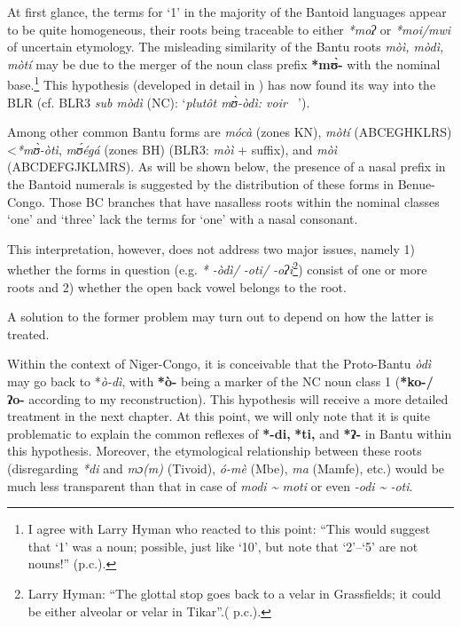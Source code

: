 At first glance, the terms for `1' in the majority of the Bantoid languages appear to be quite homogeneous, their roots being traceable to either \textit{*moʔ} or \textit{*moi/mwi} of uncertain etymology. The misleading similarity of the Bantu roots \textit{mòì, mòdì, mòtí} may be due to the merger of the noun class prefix \textbf{*m{\`{ʊ}}-} with the nominal base.\footnote{I agree with Larry Hyman who reacted to this point: “This would suggest that ‘1’ was a noun; possible, just like ‘10’, but note that `2'--`5' are not nouns!” (p.c.).} This hypothesis (developed in detail in \citealt{Vanhoudt1994}) has now found its way into the BLR (cf. BLR3 \textit{sub mòdì} (NC): ‘\textit{plutôt m{\`{ʊ}}-òdì: voir \citealt{Vanhoudt1994}~}’). 

Among other common Bantu forms are \textit{mócà} (zones KN), \textit{mòtí} (ABCEGHKLRS) <\textit{*m{\`{ʊ}}-òtì}, \textit{m{\'{ʊ}}égá} (zones BH) (BLR3: \textit{mòì} +  {suffix}), and \textit{mòì} (ABCDEFGJKLMRS). As will be shown below, the presence of a nasal prefix in the Bantoid numerals is suggested by the distribution of these forms in Benue-Congo. Those BC branches that have nasalless roots within the nominal classes ‘one’ and ‘three’ lack the terms for ‘one’ with a nasal consonant. 

This interpretation, however, does not address two major issues, namely 1) whether the forms in question (e.g. \textit{* -òdì/ -oti/ -oʔi}\footnote{Larry Hyman: “The glottal stop goes back to a velar in Grassfields; it could be either alveolar or velar in Tikar”.( p.c.).}) consist of one or more roots and 2) whether the open back vowel belongs to the root. 

A solution to the former problem may turn out to depend on how the latter is treated.

Within the context of Niger-Congo, it is conceivable that the Proto-Bantu \textit{òdì} may go back to *\textit{ò-dì}, with \textbf{*ò-} being a marker of the NC noun class 1 (\textbf{*ko-/} \textbf{ʔo-} according to my reconstruction). This hypothesis will receive a more detailed treatment in the next chapter. At this point, we will only note that it is quite problematic to explain the common reflexes of \textbf{*-di,} \textbf{*ti,} and \textbf{*ʔ-} in Bantu within this hypothesis. Moreover, the etymological relationship between these roots (disregarding \textit{*di} and \textit{mɔ(m)} (Tivoid), \textit{ó-mè} (Mbe), \textit{ma} (Mamfe), etc.) would be much less transparent than that in case of \textit{modi {\textasciitilde} moti} or even \textit{-odi {\textasciitilde} -oti}.

